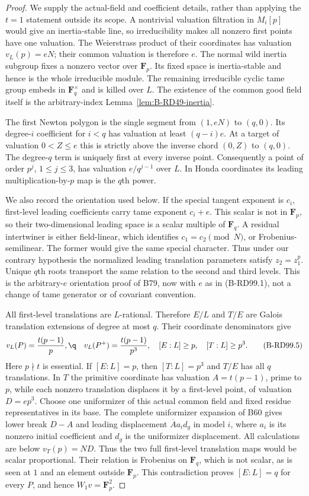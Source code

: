 \begin{proof}
We supply the actual-field and coefficient details, rather than
applying the $t=1$ statement outside its scope. A nontrivial
valuation filtration in $M_i[p]$ would give an inertia-stable
line, so irreducibility makes all nonzero first points have
one valuation. The Weierstrass product of their coordinates
has valuation $v_L(p)=eN$; their common valuation is therefore
$e$. The normal wild inertia subgroup fixes a nonzero vector
over $\mathbf F_p$. Its fixed space is inertia-stable and hence
is the whole irreducible module. The remaining irreducible
cyclic tame group embeds in $\mathbf F_q^\times$ and is killed
over $L$. The existence of the common good field itself is the
arbitrary-index Lemma~\ref{lem:B-RD49-inertia}.

The first Newton polygon is the single segment from $(1,eN)$
to $(q,0)$. Its degree-$i$ coefficient for $i<q$ has valuation
at least $(q-i)e$. At a target of valuation $0<Z\le e$ this
is strictly above the inverse chord $(0,Z)$ to $(q,0)$.
The degree-$q$ term is uniquely first at every inverse point.
Consequently a point of order $p^j$, $1\le j\le3$, has
valuation $e/q^{j-1}$ over $L$. In Honda coordinates its
leading multiplication-by-$p$ map is the $q$th power.

We also record the orientation used below. If the special
tangent exponent is $c_i$, first-level leading coefficients
carry tame exponent $c_i+e$. This scalar is not in $\mathbf F_p$,
so their two-dimensional leading space is a scalar multiple
of $\mathbf F_q$. A residual intertwiner is either field-linear,
which identifies $c_1=c_2\pmod N$, or Frobenius-semilinear.
The former would give the same special character. Thus under
our contrary hypothesis the normalized leading translation
parameters satisfy $z_2=z_1^p$. Unique $q$th roots transport
the same relation to the second and third levels. This is the
arbitrary-$e$ orientation proof of B79, now with $e$ as in
(B-RD99.1), not a change of tame generator or of covariant
convention.

All first-level translations are $L$-rational. Therefore
$E/L$ and $T/E$ are Galois translation extensions of degree
at most $q$. Their coordinate denominators give
\[
 v_L(P)=\frac{t(p-1)}p,\q\quad
 v_L(P^+)=\frac{t(p-1)}{p^3},
 \quad [E:L]\ge p,\quad[T:L]\ge p^3.                 \tag{B-RD99.5}
\]
Here $p\nmid t$ is essential. If $[E:L]=p$, then $[T:L]=p^3$
and $T/E$ has all $q$ translations. In $T$ the primitive
coordinate has valuation $A=t(p-1)$, prime to $p$, while
each nonzero translation displaces it by a first-level point,
of valuation $D=ep^3$. Choose one uniformizer of this actual
common field and fixed residue representatives in its base.
The complete uniformizer expansion of B60 gives lower break
$D-A$ and leading displacement $\overline A a_i d_g$ in
model $i$, where $a_i$ is its nonzero initial coefficient and
$d_g$ is the uniformizer displacement. All calculations are
below $v_T(p)=ND$. Thus the two full first-level translation
maps would be scalar proportional. Their relation is Frobenius
on $\mathbf F_q$, which is not scalar, as is seen at $1$ and
an element outside $\mathbf F_p$. This contradiction proves
$[E:L]=q$ for every $P$, and hence $W_1v=\mathbf F_p^2$.


\end{proof}
